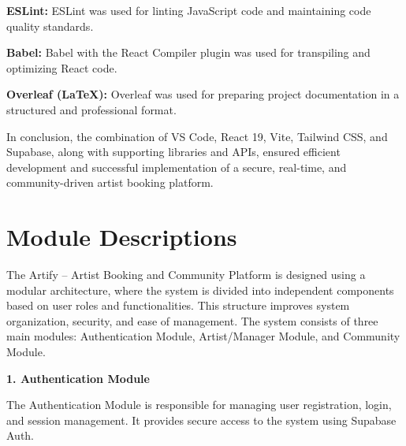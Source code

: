\documentclass[12pt,a4paper]{report}
\begin{document}
\textbf{ESLint:}
ESLint was used for linting JavaScript code and maintaining code quality standards.

\vspace{0.4cm}

\textbf{Babel:}
Babel with the React Compiler plugin was used for transpiling and optimizing React code.

\vspace{0.4cm}

\textbf{Overleaf (LaTeX):}
Overleaf was used for preparing project documentation in a structured and professional format.

\vspace{0.4cm}

In conclusion, the combination of VS Code, React 19, Vite, Tailwind CSS, and Supabase, along with supporting libraries and APIs, ensured efficient development and successful implementation of a secure, real-time, and community-driven artist booking platform.

\setcounter{chapter}{4}

\clearpage
\thispagestyle{empty}

\noindent
{}

\clearpage
{}
\setcounter{section}{0}

\section{Module Descriptions}

The Artify -- Artist Booking and Community Platform is designed using a modular architecture, where the system is divided into independent components based on user roles and functionalities. This structure improves system organization, security, and ease of management. The system consists of three main modules: Authentication Module, Artist/Manager Module, and Community Module.

\textbf{1. Authentication Module}

The Authentication Module is responsible for managing user registration, login, and session management. It provides secure access to the system using Supabase Auth.
\end{document}
